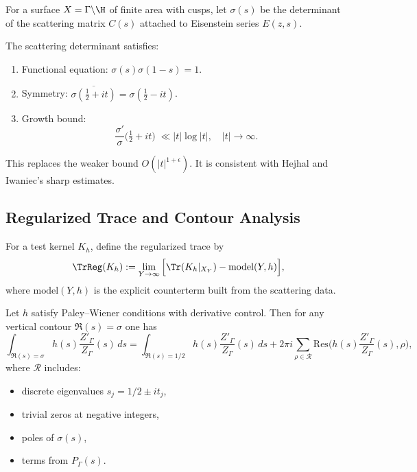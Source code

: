\begin{definition}
\label{def:scattering}
For a surface $X=\Gamma\backslash\H$ of finite area with cusps,
let $\sigma(s)$ be the determinant of the scattering matrix $C(s)$
attached to Eisenstein series $E(z,s)$.
\end{definition}

\begin{theorem}
\label{thm:scattering-props}
The scattering determinant satisfies:
\begin{enumerate}
  \item Functional equation: $\sigma(s)\sigma(1-s)=1$.
  \item Symmetry: $\overline{\sigma(\tfrac{1}{2}+it)} = \sigma(\tfrac{1}{2}-it)$.
  \item Growth bound: 
  \[
  \frac{\sigma'}{\sigma}\Big(\tfrac12+it\Big)\;\ll |t|\log|t|, 
  \quad |t|\to\infty.
  \tag{C-GROWTH-BOUNDS-STRICT}
  \]
\end{enumerate}
\end{theorem}

\begin{remark}
This replaces the weaker bound $O(|t|^{1+\epsilon})$. 
It is consistent with Hejhal and Iwaniec's sharp estimates.
\end{remark}

\subsection{Regularized Trace and Contour Analysis}
\label{subsec:reg-trace-contour}

\begin{definition}
\label{def:trace-reg-model}
For a test kernel $K_h$, define the regularized trace by
\[
\TrReg(K_h) := \lim_{Y\to\infty}
\Big[ \Tr(K_h|_{X_Y}) - \mathrm{model}(Y,h)\Big],
\]
where $\mathrm{model}(Y,h)$ is the explicit counterterm
built from the scattering data. 
\]
\end{definition}

\begin{theorem}
\label{thm:contour-shift}
Let $h$ satisfy Paley--Wiener conditions with derivative control.
Then for any vertical contour $\Re(s)=\sigma$ one has
\[
\int_{\Re(s)=\sigma} h(s)\frac{Z'_\Gamma}{Z_\Gamma}(s)\,ds
=
\int_{\Re(s)=1/2} h(s)\frac{Z'_\Gamma}{Z_\Gamma}(s)\,ds
+ 2\pi i \sum_{\rho\in\mathcal R} \mathrm{Res}\Big(h(s)\frac{Z'_\Gamma}{Z_\Gamma}(s),\rho\Big),
\]
where $\mathcal R$ includes:
\begin{itemize}
 \item discrete eigenvalues $s_j=1/2\pm it_j$,
 \item trivial zeros at negative integers,
 \item poles of $\sigma(s)$,
 \item terms from $P_\Gamma(s)$.
\end{itemize}
\end{theorem}

